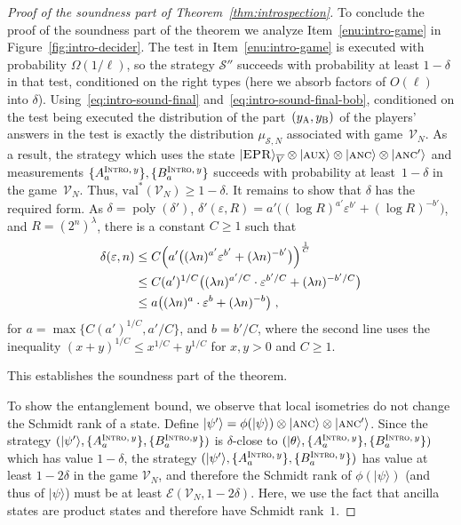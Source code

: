 \documentclass[11pt]{article}
\theoremstyle{definition}
\newcommand{\ket}[1]{|#1\rangle}
\DeclareMathOperator{\poly}{poly}
\newcommand{\val}{\ensuremath{\mathrm{val}}}
\newcommand{\eps}{\varepsilon}
\newcommand{\sampler}{\mathcal{S}}
\newcommand{\verifier}{\mathcal{V}}
\newcommand{\strategy}{\mathscr{S}}
\newcommand{\labelstyle}[1]{\ensuremath{\textsc{#1}}\xspace}
\newcommand{\EPR}{\labelstyle{EPR}}
\newcommand{\aux}{\labelstyle{aux}}
\newcommand{\ancilla}{\labelstyle{anc}}
\newcommand{\alice}{\labelstyle{A}}
\newcommand{\bob}{\labelstyle{B}}
\newcommand{\typestyle}[1]{\ensuremath{\textsc{#1}}\xspace}
\newcommand{\Intro}{\typestyle{Intro}}
\newcommand{\Ent}{\mathscr{E}}
\begin{document}
\begin{proof}[Proof of the soundness part of Theorem~\ref{thm:introspection}]
	To conclude the proof of the soundness part of the theorem we analyze
  Item~\ref{enu:intro-game} in Figure~\ref{fig:intro-decider}.
  The test in Item~\ref{enu:intro-game} is executed with probability
  $\Omega(1/\ell)$, so the strategy $\strategy''$ succeeds with probability at
  least $1 - \delta$ in that test, conditioned on the right types (here we
  absorb factors of $O(\ell)$ into $\delta$).
  Using~\eqref{eq:intro-sound-final} and~\eqref{eq:intro-sound-final-bob},
  conditioned on the test being executed the distribution of the
  part~$(y_\alice, y_\bob)$ of the players' answers in the test is exactly the
  distribution $\mu_{\sampler, N}$ associated with game~$\verifier_N$.
  As a result, the strategy which uses the state $\ket{\EPR}_{\overline{V}}
  \otimes \ket{\aux} \otimes \ket{\ancilla} \otimes \ket{\ancilla'}$ and
  measurements $ \{ A^{\Intro,\, y}_a \},\{ B^{\Intro,\, y}_a \}$ succeeds with
  probability at least~$1- \delta$ in the game~$\verifier_N$.
  Thus, $\val^*(\verifier_N) \geq 1- \delta$.
  It remains to show that $\delta$ has the required form. 
  As $\delta = \poly(\delta')$, $\delta'(\eps, R) = a' \bigl( (\log
  R)^{a'}\eps^{b'} + (\log R)^{-b'} \bigr)$, and $R = (2^n)^\lambda$, there is a
  constant $C \ge 1$ such that
  \begin{equation*}
    \begin{split}
      \delta(\eps, n) & \le C \Bigl( a' \bigl( (\lambda n)^{a'} \eps^{b'} +
      (\lambda n)^{-b'} \bigr) \Bigr)^{\frac{1}{C}}\\
      & \le C (a')^{1/C} \bigl(  (\lambda n)^{a'/C} \cdot \eps^{b'/C} + (\lambda n)^{-b'/C} \bigr)\\
      & \le a \bigl( (\lambda n)^a \cdot \eps^b + (\lambda n)^{-b} \bigr)\;,
    \end{split}
  \end{equation*}
  for $a = \max \bigl\{ C (a')^{1/C}, a'/C \bigr\}$, and $b = b'/C$, where the
  second line uses the inequality $(x+y)^{1/C} \le x^{1/C} + y^{1/C}$ for
  $x,y>0$ and $C\ge 1$. 
  
  
  This establishes the soundness part of the theorem.

  To show the entanglement bound, we observe that local isometries do not change
  the Schmidt rank of a state.
  Define $\ket{\psi'} = \phi(\ket{\psi}) \otimes \ket{\ancilla} \otimes
  \ket{\ancilla'}$.
  Since the strategy $(\ket{\psi'}, \{ A^{\Intro,\, y}_a \},\{ B^{\Intro, y}_a
  \})$ is $\delta$-close to $(\ket{\theta}, \{ A^{\Intro,\, y}_a \},\{
  B^{\Intro,\, y}_a \})$ which has value $1 - \delta$, the strategy
  $(\ket{\psi'}, \{ A^{\Intro,\, y}_a \},\{ B^{\Intro,\, y}_a \})$ has value at
  least $1 - 2\delta$ in the game $\verifier_N$, and therefore the Schmidt rank
  of $\phi(\ket{\psi})$ (and thus of $\ket{\psi}$) must be at least
  $\Ent(\verifier_N,1 - 2\delta)$.
  Here, we use the fact that ancilla states are product states and therefore
  have Schmidt rank~$1$.
  

\end{proof}
\end{document}
